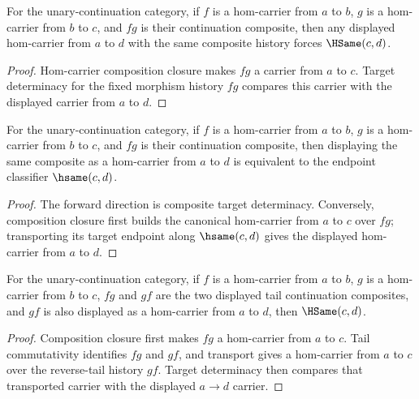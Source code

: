 \begin{theorem}
\label{thm:category-hom-carrier-comp-target-deterministic}
For the unary-continuation category, if \(f\) is a hom-carrier from \(a\) to
\(b\), \(g\) is a hom-carrier from \(b\) to \(c\), and \(fg\) is their
continuation composite, then any displayed hom-carrier from \(a\) to \(d\) with
the same composite history forces \(\HSame(c,d)\).
\end{theorem}
\begin{proof}
Hom-carrier composition closure makes \(fg\) a carrier from \(a\) to \(c\).
Target determinacy for the fixed morphism history \(fg\) compares this carrier
with the displayed carrier from \(a\) to \(d\).
\end{proof}

\begin{theorem}
\label{thm:category-hom-carrier-comp-endpoint-iff}
For the unary-continuation category, if \(f\) is a hom-carrier from \(a\) to
\(b\), \(g\) is a hom-carrier from \(b\) to \(c\), and \(fg\) is their
continuation composite, then displaying the same composite as a hom-carrier
from \(a\) to \(d\) is equivalent to the endpoint classifier \(\hsame(c,d)\).
\end{theorem}
\begin{proof}
The forward direction is composite target determinacy. Conversely, composition
closure first builds the canonical hom-carrier from \(a\) to \(c\) over \(fg\);
transporting its target endpoint along \(\hsame(c,d)\) gives the displayed
hom-carrier from \(a\) to \(d\).
\end{proof}

\begin{theorem}
\label{thm:category-hom-carrier-tail-comm-target-deterministic}
For the unary-continuation category, if $f$ is a hom-carrier from $a$ to $b$,
$g$ is a hom-carrier from $b$ to $c$, $fg$ and $gf$ are the two displayed tail
continuation composites, and $gf$ is also displayed as a hom-carrier from $a$
to $d$, then $\HSame(c,d)$.
\end{theorem}
\begin{proof}
Composition closure first makes $fg$ a hom-carrier from $a$ to $c$. Tail
commutativity identifies $fg$ and $gf$, and transport gives a hom-carrier from
$a$ to $c$ over the reverse-tail history $gf$. Target determinacy then compares
that transported carrier with the displayed $a\to d$ carrier.
\end{proof}

